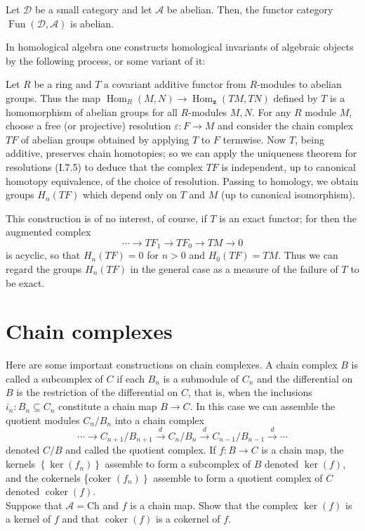 \begin{example}
\begin{prop}
Let $\mathcal{D}$ be a small category and let $\mathcal{A}$ be abelian. Then, the functor category $\operatorname{Fun}(\mathcal{D}, \mathcal{A})$ is abelian.   
\end{prop}

In homological algebra one constructs homological invariants of algebraic objects by the following process, or some variant of it:

Let $R$ be a ring and $T$ a covariant additive functor from $R$-modules to abelian groups. Thus the map $\operatorname{Hom}_R(M, N) \rightarrow \operatorname{Hom}_{\mathbf{z}}(T M, T N)$ defined by $T$ is a homomorphism of abelian groups for all $R$-modules $M, N$. For any $R$ module $M$, choose a free (or projective) resolution $\varepsilon: F \rightarrow M$ and consider the chain complex $T F$ of abelian groups obtained by applying $T$ to $F$ termwise. Now $T$, being additive, preserves chain homotopies; so we can apply the uniqueness theorem for resolutions (I.7.5) to deduce that the complex $T F$ is independent, up to canonical homotopy equivalence, of the choice of resolution. Passing to homology, we obtain groups $H_n(T F)$ which depend only on $T$ and $M$ (up to canonical isomorphism).

This construction is of no interest, of course, if $T$ is an exact functor; for then the augmented complex
$$
\cdots \rightarrow T F_1 \rightarrow T F_0 \rightarrow T M \rightarrow 0
$$
is acyclic, so that $H_n(T F)=0$ for $n>0$ and $H_0(T F)=T M$. Thus we can regard the groups $H_n(T F)$ in the general case as a measure of the failure of $T$ to be exact.

\section{Chain complexes}

Here are some important constructions on chain complexes. A chain complex $B$ is called a subcomplex of $C$ if each $B_n$ is a submodule of $C_n$ and the differential on $B$ is the restriction of the differential on $C$, that is, when the inclusions $i_n: B_n \subseteq C_n$ constitute a chain map $B \rightarrow C$. In this case we can assemble the quotient modules $C_n / B_n$ into a chain complex
$$
\cdots \rightarrow C_{n+1} / B_{n+1} \xrightarrow{d} C_n / B_n \xrightarrow{d} C_{n-1} / B_{n-1} \xrightarrow{d} \cdots
$$
denoted $C / B$ and called the quotient complex. If $f: B \rightarrow C$ is a chain map, the kernels $\left\{\operatorname{ker}\left(f_n\right)\right\}$ assemble to form a subcomplex of $B$ denoted $\operatorname{ker}(f)$, and the cokernels \{coker $\left.\left(f_n\right)\right\}$ assemble to form a quotient complex of $C$ denoted $\operatorname{coker}(f)$.\\
Suppose that $\mathcal{A}=\mathrm{Ch}$ and $f$ is a chain map. Show that the complex $\operatorname{ker}(f)$ is a kernel of $f$ and that $\operatorname{coker}(f)$ is a cokernel of $f$.


\end{example}
